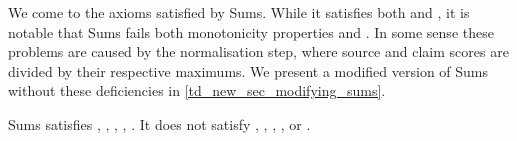 We come to the axioms satisfied by Sums. While it satisfies both
\claimcoherence{} and \sourcecoherence{}, it is notable that Sums fails both
monotonicity properties and \disjointindependence{}. In some sense these
problems are caused by the normalisation step, where source and claim scores
are divided by their respective maximums. We present a modified version of Sums
without these deficiencies in \cref{td_new_sec_modifying_sums}.

\begin{theorem}
    Sums satisfies \claimcoherence{}, \sourcecoherence{}, \symmetry{},
    \marginaltrustworthiness{}, \trustbasedmon{}. It does not satisfy
    \freshposresp{}, \sourceposresp{}, \classicalindependence{},
    \disjointindependence{}, \conflictcoherence{} or \anticoherence{}.
\end{theorem}

